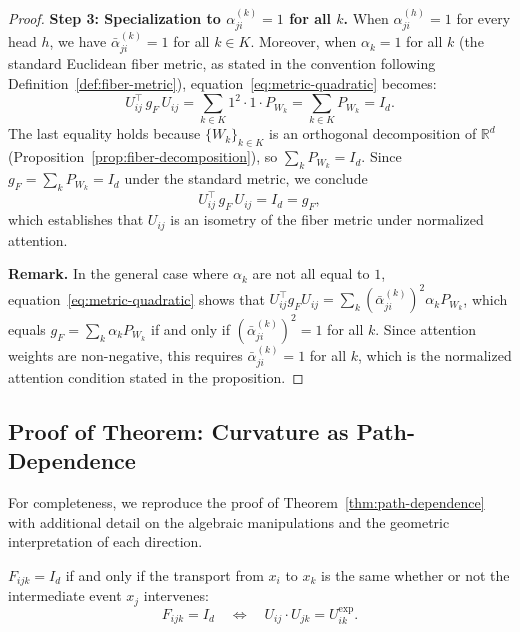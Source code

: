 \begin{proof}
\medskip\noindent\textbf{Step 3: Specialization to $\alpha_{ji}^{(k)} = 1$ for all $k$.}
When $\alpha_{ji}^{(h)} = 1$ for every head $h$, we have $\bar{\alpha}_{ji}^{(k)} = 1$ for
all $k \in K$. Moreover, when $\alpha_k = 1$ for all $k$ (the standard Euclidean fiber
metric, as stated in the convention following Definition~\ref{def:fiber-metric}),
equation~\eqref{eq:metric-quadratic} becomes:
\[
    U_{ij}^\top\, g_F\, U_{ij}
    = \sum_{k \in K} 1^2 \cdot 1 \cdot P_{W_k}
    = \sum_{k \in K} P_{W_k}
    = I_d.
\]
The last equality holds because $\{W_k\}_{k \in K}$ is an orthogonal decomposition of
$\mathbb{R}^d$ (Proposition~\ref{prop:fiber-decomposition}), so $\sum_k P_{W_k} = I_d$.
Since $g_F = \sum_k P_{W_k} = I_d$ under the standard metric, we conclude
\[
    U_{ij}^\top\, g_F\, U_{ij} = I_d = g_F,
\]
which establishes that $U_{ij}$ is an isometry of the fiber metric under normalized
attention.

\medskip\noindent\textbf{Remark.} In the general case where $\alpha_k$ are not all equal
to $1$, equation~\eqref{eq:metric-quadratic} shows that $U_{ij}^\top g_F U_{ij} =
\sum_k (\bar{\alpha}_{ji}^{(k)})^2 \alpha_k P_{W_k}$, which equals $g_F = \sum_k
\alpha_k P_{W_k}$ if and only if $(\bar{\alpha}_{ji}^{(k)})^2 = 1$ for all $k$. Since
attention weights are non-negative, this requires $\bar{\alpha}_{ji}^{(k)} = 1$ for all
$k$, which is the normalized attention condition stated in the proposition.
\end{proof}

\subsection{Proof of Theorem: Curvature as Path-Dependence}
\label{app:proof-path-dependence}

For completeness, we reproduce the proof of Theorem~\ref{thm:path-dependence} with
additional detail on the algebraic manipulations and the geometric interpretation of each
direction.

\begin{theorem}
\label{thm:path-dependence-app}
$F_{ijk} = I_d$ if and only if the transport from $x_i$ to $x_k$ is the same whether or
not the intermediate event $x_j$ intervenes:
\[
    F_{ijk} = I_d \quad\Longleftrightarrow\quad U_{ij} \cdot U_{jk} = U_{ik}^{\exp}.
\]
\end{theorem}

